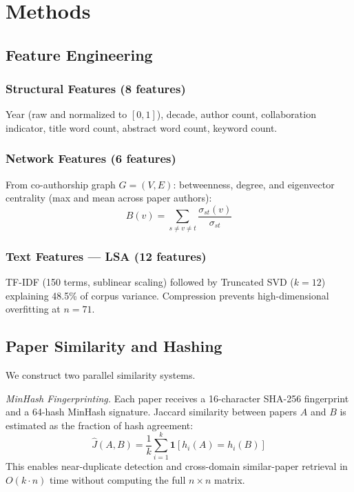 \documentclass[journal]{IEEEtran}
\begin{document}
\section{Methods}
\label{sec:methods}

\subsection{Feature Engineering}

\subsubsection{Structural Features (8 features)}
Year (raw and normalized to $[0,1]$), decade, author count, collaboration
indicator, title word count, abstract word count, keyword count.

\subsubsection{Network Features (6 features)}
From co-authorship graph $G=(V,E)$: betweenness, degree, and eigenvector
centrality (max and mean across paper authors):
\begin{equation}
B(v) = \sum_{s \neq v \neq t} \frac{\sigma_{st}(v)}{\sigma_{st}}
\end{equation}

\subsubsection{Text Features --- LSA (12 features)}
TF-IDF (150 terms, sublinear scaling) followed by Truncated SVD ($k{=}12$)
explaining 48.5\% of corpus variance. Compression prevents high-dimensional
overfitting at $n{=}71$.

\subsection{Paper Similarity and Hashing}
\label{sec:hashing}

We construct two parallel similarity systems.

\textit{MinHash Fingerprinting.} Each paper receives a 16-character SHA-256
fingerprint and a 64-hash MinHash signature. Jaccard similarity between papers
$A$ and $B$ is estimated as the fraction of hash agreement:
\begin{equation}
\hat{J}(A,B) = \frac{1}{k}\sum_{i=1}^{k} \mathbf{1}[h_i(A) = h_i(B)]
\end{equation}
This enables near-duplicate detection and cross-domain similar-paper retrieval
in $O(k \cdot n)$ time without computing the full $n \times n$ matrix.
\end{document}
